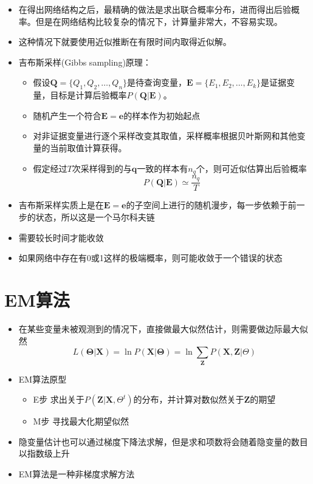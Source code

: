 \begin{itemize}
\item 在得出网络结构之后，最精确的做法是求出联合概率分布，进而得出后验概率。但是在网络结构比较复杂的情况下，计算量非常大，不容易实现。
\item 这种情况下就要使用近似推断在有限时间内取得近似解。
\item 吉布斯采样(Gibbs sampling)原理：
    \begin{itemize}
    \item 假设$\mathbf{Q}=\{Q_1,Q_2,\dots,Q_n\}$是待查询变量，$\mathbf{E}=\{E_1,E_2,\dots,E_k\}$是证据变量，目标是计算后验概率$P(\mathbf{Q}|\mathbf{E})$。
    \item 随机产生一个符合$\mathbf{E=e}$的样本作为初始起点
    \item 对非证据变量进行逐个采样改变其取值，采样概率根据贝叶斯网和其他变量的当前取值计算获得。
    \item 假定经过$T$次采样得到的与$\mathbf{q}$一致的样本有$n_q$个，则可近似估算出后验概率\begin{equation}P(\mathbf{Q}|\mathbf{E})\simeq \frac{n_q}{T}\end{equation}
    \end{itemize}
\item 吉布斯采样实质上是在$\mathbf{E=e}$的子空间上进行的随机漫步，每一步依赖于前一步的状态，所以这是一个马尔科夫链
    \item 需要较长时间才能收敛
    \item 如果网络中存在有0或1这样的极端概率，则可能收敛于一个错误的状态
\end{itemize}

\section{EM算法}

\begin{itemize}
\item 在某些变量未被观测到的情况下，直接做最大似然估计，则需要做边际最大似然\begin{equation}L(\mathbf{\Theta|X})=\ln P(\mathbf{X|\Theta})=\ln \sum_{\mathbf{Z}}P(\mathbf{X,Z}|\Theta)\end{equation}
\item EM算法原型
    \begin{itemize}
    \item E步 求出关于$P(\mathbf{Z}|\mathbf{X},\Theta^t)$的分布，并计算对数似然关于$\mathbf{Z}$的期望
    \item M步 寻找最大化期望似然
    \end{itemize}
\item 隐变量估计也可以通过梯度下降法求解，但是求和项数将会随着隐变量的数目以指数级上升
\item EM算法是一种非梯度求解方法
\end{itemize}
